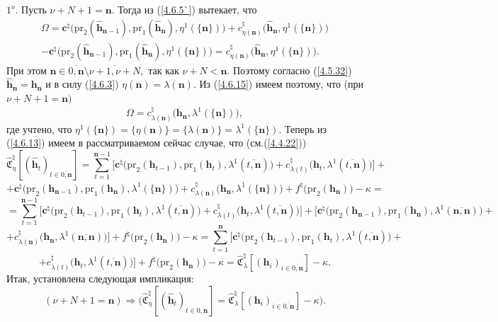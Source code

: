 \documentclass[12pt]{report}
\newcommand{\bfn}{\begin{equation}}
\newcommand{\efn}{\end{equation}}
\newcommand{\ov}{\overline}
\newcommand{\Om}{\Omega}
\newcommand{\la}{\lambda}
\newcommand{\zc}{{\mathbf c}}
\newcommand{\nn}{{\mathbf n}}
\begin{document}
{{ $1^o.$ Пусть $\nu+N+1 = \nn.$ Тогда из (\ref{4.6.5`}) вытекает, что
 \begin{eqnarray}
&\Om = \zc^\natural\bigl(\mathrm{pr}_2(\hat{\mathbf{h}}_{\nn-1}),\mathrm{pr}_1(\hat{\mathbf{h}}_\nn),
 \eta^1(\{\nn\})\bigl) + c_{\eta(\nn)}^\natural\bigl(\hat{\mathbf{h}}_\nn,\eta^1(\{\nn\})\bigl)
&\nonumber\\
&- \zc^\natural\bigl(\mathrm{pr}_2(\hat{\mathbf{h}}_{\nn-1}),\mathrm{pr}_1(\hat{\mathbf{h}}_\nn),
 \eta^1(\{\nn\})\bigl)=
 c_{\eta(\nn)}^\natural\bigl(\hat{\mathbf{h}}_\nn,\eta^1(\{\nn\})\bigl).
&\label{4.6.15}
\end{eqnarray}
При этом $\nn\in \ov{0,\nn}\setminus \ov{\nu+1,\nu+N},$ так как $\nu+N < \nn.$ Поэтому
согласно (\ref{4.5.32}) $\hat{\mathbf{h}}_\nn =\mathbf{h}_\nn$ и в силу (\ref{4.6.3})
$\eta(\nn) = \la(\nn).$ Из (\ref{4.6.15}) имеем поэтому, что (при $\nu+N+1 = \nn)$
$$\Om = c_{\la(\nn)}^\natural\bigl(\mathbf{h}_\nn,\la^1(\{\nn\})\bigl),
$$
где учтено, что $\eta^1(\{\nn\}) = \{\eta(\nn)\} = \{\la(\nn)\} = \la^1(\{\nn\}).$ Теперь из
(\ref{4.6.13}) имеем в рассматриваемом сейчас случае, что (см.(\ref{4.4.22}))
$$\widehat{\mathfrak{C}}_\eta^\natural[(\hat{\mathbf{h}}_t)_{t\in\ov{0,\nn}}]=
\sum\limits_{t=1}^{\nn-1}\bigl[\zc^\natural\bigl(\mathrm{pr}_2(\mathbf{h}_{t-1}),\mathrm{pr}_1
(\mathbf{h}_t),\la^1(\ov{t,\nn})\bigl)+ c_{\la(t)}^\natural\bigl(\mathbf{h}_t,\la^1(\ov{t,\nn})\bigl)\bigl] +
$$
$$+ \zc^\natural\bigl(\mathrm{pr}_2(\mathbf{h}_{\nn-1}),\mathrm{pr}_1
(\mathbf{h}_\nn),\la^1(\{\nn\})\bigl)+ c_{\la(\nn)}^\natural\bigl(\mathbf{h}_\nn,\la^1(\{\nn\})\bigl) +
f^\natural\bigl(\mathrm{pr}_2(\mathbf{h}_\nn)\bigl) -\kappa = $$
$$= \sum\limits_{t=1}^{\nn-1}\bigl[\zc^\natural\bigl(\mathrm{pr}_2(\mathbf{h}_{t-1}),\mathrm{pr}_1
(\mathbf{h}_t),\la^1(\ov{t,\nn})\bigl)+ c_{\la(t)}^\natural\bigl(\mathbf{h}_t,\la^1(\ov{t,\nn})\bigl)\bigl] +
\bigl[\zc^\natural\bigl(\mathrm{pr}_2(\mathbf{h}_{\nn-1}),\mathrm{pr}_1(\mathbf{h}_\nn),\la^1(\ov{\nn,\nn})
\bigl)+
$$
$$+ c_{\la(\nn)}^\natural\bigl(\mathbf{h}_\nn,\la^1(\ov{\nn,\nn})\bigl)\bigl] +
f^\natural\bigl(\mathrm{pr}_2(\mathbf{h}_\nn)\bigl) -\kappa =
\sum\limits_{t=1}^\nn\bigl[\zc^\natural\bigl(\mathrm{pr}_2(\mathbf{h}_{t-1}),\mathrm{pr}_1
(\mathbf{h}_t),\la^1(\ov{t,\nn})\bigl)+
$$
$$+ c_{\la(t)}^\natural\bigl(\mathbf{h}_t,\la^1(\ov{t,\nn})\bigl)\bigl] +
f^\natural\bigl(\mathrm{pr}_2(\mathbf{h}_\nn)\bigl) -\kappa =
\widehat{\mathfrak{C}}_\lambda^\natural[(\mathbf{h}_i)_{i\in\ov{0,\nn}}]-\kappa.
$$
Итак, установлена следующая импликация:
\bfn\label{4.6.16}
(\nu+N+1 =\nn)\Longrightarrow \bigl(\widehat{\mathfrak{C}}_\eta^\natural[(\hat{\mathbf{h}}_t)_{t\in\ov{0,\nn}}]=
\widehat{\mathfrak{C}}_\la^\natural[(\mathbf{h}_i)_{i\in\ov{0,\nn}}]-\kappa\bigl).
\efn

}}
\end{document}

